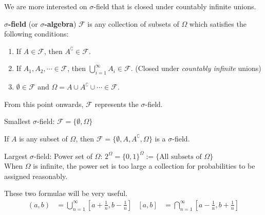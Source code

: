 \documentclass{huhtakm-template-book}
\begin{document}
    \newpage
    We are more interested on $\sigma$-field that is closed under countably infinite unions.
    \begin{defn} %
        \textbf{$\sigma$-field} (or \textbf{$\sigma$-algebra}) $\mathcal{F}$ is any collection of subsets of $\Omega$ which satisfies the following conditions:
        \begin{enumerate}
            \item If $A\in\mathcal{F}$, then $A^{\complement}\in\mathcal{F}$.
            \item If $A_{1},A_{2},\cdots\in\mathcal{F}$, then $\bigcup_{i=1}^{\infty}A_{i}\in\mathcal{F}$. (Closed under \textit{countably infinite} unions)
            \item $\emptyset\in\mathcal{F}$ and $\Omega=A\cup A^{\complement}\cup\cdots\in\mathcal{F}$.
        \end{enumerate}
    \end{defn}
    \begin{rem}
    	From this point onwards, $\mathcal{F}$ represents the $\sigma$-field.
    \end{rem}
    \begin{eg}
        Smallest $\sigma$-field: $\mathcal{F}=\{\emptyset,\Omega\}$
    \end{eg}
    \begin{eg}
        If $A$ is any subset of $\Omega$, then $\mathcal{F}=\{\emptyset,A,A^{\complement},\Omega\}$ is a $\sigma$-field.
    \end{eg}
    \begin{eg}
        Largest $\sigma$-field: Power set of $\Omega$: $2^{\Omega}=\{0,1\}^{\Omega}:=\{\text{All subsets of }\Omega\}$\\
        When $\Omega$ is infinite, the power set is too large a collection for probabilities to be assigned reasonably.
    \end{eg}
    \begin{rem}
        These two formulae will be very useful.
        \begin{align*}
            (a,b)&=\bigcup_{n=1}^{\infty}\left[a+\frac{1}{n},b-\frac{1}{n}\right] &             [a,b]&=\bigcap_{n=1}^{\infty}\left[a-\frac{1}{n},b+\frac{1}{n}\right]
        \end{align*}
    \end{rem}
    
\end{document}
